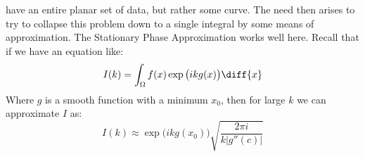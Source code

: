                 have an entire planar set of data, but rather some
                curve. The need then arises to try to collapse this
                problem down to a single integral by some means of
                approximation. The Stationary Phase Approximation
                works well here. Recall that if we have an equation
                like:
                \begin{equation}
                    I(k)=
                    \int_{\Omega}f(x)\exp\big(ikg(x)\big)\diff{x}
                \end{equation}
                Where $g$ is a smooth function with a minimum
                $x_{0}$, then for large $k$
                we can approximate $I$ as:
                \begin{equation}
                    I(k)\approx
                    \exp\big(ikg(x_{0})\big)
                        \sqrt{\frac{2\pi{i}}{k|g''(c)|}}
                \end{equation}
